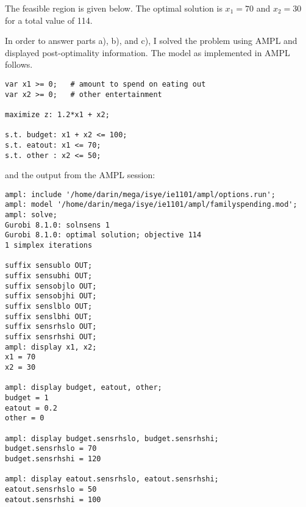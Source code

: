 \begin{enumerate}
\begin{solution}
The feasible region is given below. The optimal solution is $x_1=70$ and $x_2=30$
for a total value of 114.
\begin{center}
\end{center}

In order to answer parts a), b), and c), I solved the problem using AMPL
and displayed post-optimality information. The model as implemented in AMPL follows.
\begin{Verbatim}[samepage=true]
var x1 >= 0;   # amount to spend on eating out
var x2 >= 0;   # other entertainment

maximize z: 1.2*x1 + x2;

s.t. budget: x1 + x2 <= 100;
s.t. eatout: x1 <= 70;
s.t. other : x2 <= 50;
\end{Verbatim}
and the output from the AMPL session:
\begin{Verbatim}[samepage=true]
ampl: include '/home/darin/mega/isye/ie1101/ampl/options.run';
ampl: model '/home/darin/mega/isye/ie1101/ampl/familyspending.mod';
ampl: solve;
Gurobi 8.1.0: solnsens 1
Gurobi 8.1.0: optimal solution; objective 114
1 simplex iterations

suffix sensublo OUT;
suffix sensubhi OUT;
suffix sensobjlo OUT;
suffix sensobjhi OUT;
suffix senslblo OUT;
suffix senslbhi OUT;
suffix sensrhslo OUT;
suffix sensrhshi OUT;
ampl: display x1, x2;
x1 = 70
x2 = 30

ampl: display budget, eatout, other;
budget = 1
eatout = 0.2
other = 0

ampl: display budget.sensrhslo, budget.sensrhshi;
budget.sensrhslo = 70
budget.sensrhshi = 120

ampl: display eatout.sensrhslo, eatout.sensrhshi;
eatout.sensrhslo = 50
eatout.sensrhshi = 100
\end{Verbatim}


\end{solution}
\end{enumerate}
